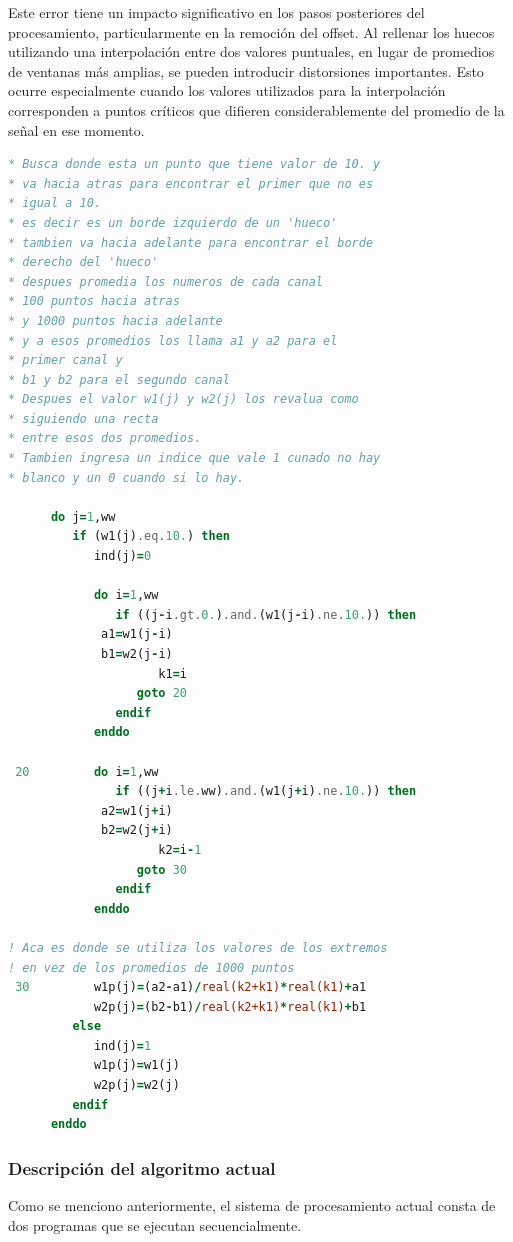 \documentclass[12pt,a4paper]{article}
\begin{document}
Este error tiene un impacto significativo en los pasos posteriores del procesamiento, particularmente en la remoción del offset. Al rellenar los huecos utilizando una interpolación entre dos valores puntuales, en lugar de promedios de ventanas más amplias, se pueden introducir distorsiones importantes. Esto ocurre especialmente cuando los valores utilizados para la interpolación corresponden a puntos críticos que difieren considerablemente del promedio de la señal en ese momento.

\begin{lstlisting}[language=Fortran, label=lst:codigo_error]
* Busca donde esta un punto que tiene valor de 10. y 
* va hacia atras para encontrar el primer que no es
* igual a 10.
* es decir es un borde izquierdo de un 'hueco'
* tambien va hacia adelante para encontrar el borde
* derecho del 'hueco'
* despues promedia los numeros de cada canal
* 100 puntos hacia atras
* y 1000 puntos hacia adelante 
* y a esos promedios los llama a1 y a2 para el 
* primer canal y
* b1 y b2 para el segundo canal
* Despues el valor w1(j) y w2(j) los revalua como
* siguiendo una recta 
* entre esos dos promedios.
* Tambien ingresa un indice que vale 1 cunado no hay
* blanco y un 0 cuando si lo hay.

      do j=1,ww
         if (w1(j).eq.10.) then
            ind(j)=0
            
            do i=1,ww
               if ((j-i.gt.0.).and.(w1(j-i).ne.10.)) then
		     a1=w1(j-i)
		     b1=w2(j-i)                  
                     k1=i
                  goto 20
               endif
            enddo
            
 20         do i=1,ww  
               if ((j+i.le.ww).and.(w1(j+i).ne.10.)) then
		     a2=w1(j+i)
		     b2=w2(j+i)                  
                     k2=i-1
                  goto 30
               endif
            enddo

! Aca es donde se utiliza los valores de los extremos
! en vez de los promedios de 1000 puntos
 30         w1p(j)=(a2-a1)/real(k2+k1)*real(k1)+a1
            w2p(j)=(b2-b1)/real(k2+k1)*real(k1)+b1
         else
            ind(j)=1
            w1p(j)=w1(j)
            w2p(j)=w2(j)
         endif
      enddo
\end{lstlisting}


\subsubsection{Descripción del algoritmo actual}
Como se menciono anteriormente, el sistema de procesamiento actual consta de dos programas que se ejecutan
secuencialmente.
\end{document}
